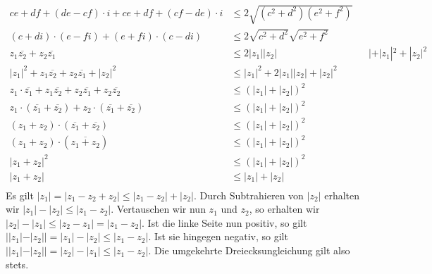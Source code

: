 \documentclass{article}
\begin{document}
\begin{enumerate}[(a)]
\begin{align*}
	ce + df + (de -cf)\cdot i + ce + df + (cf -de)\cdot i &\leq 2\sqrt{(c^2 + d^2)(e^2 + f^2)}\\
	(c + di) \cdot (e -fi) + (e + fi)\cdot (c -di)&\leq 2\sqrt{c^2 + d^2}\sqrt{e^2 + f^2}\\
	z_1\overline{z_2} + z_2\overline{z_1} &\leq 2|z_1||z_2|&&|+|z_1|^2 + |z_2|^2\\
	|z_1|^2 + z_1\overline{z_2} + z_2\overline{z_1} + |z_2|^2 &\leq |z_1|^2 + 2|z_1||z_2| + |z_2|^2\\
	z_1 \cdot \overline{z_1} + z_1\overline{z_2} + z_2\overline{z_1} + z_2\overline{z_2} &\leq (|z_1| + |z_2|)^2\\
	z_1 \cdot (\overline{z_1} + \overline{z_2}) + z_2 \cdot (\overline{z_1} + \overline{z_2}) &\leq (|z_1| + |z_2|)^2\\
	(z_1 + z_2) \cdot (\overline{z_1} + \overline{z_2}) &\leq (|z_1| + |z_2|)^2\\
	(z_1 + z_2) \cdot (\overline{z_1+z_2}) &\leq (|z_1| + |z_2|)^2\\
	|z_1 + z_2|^2 &\leq (|z_1| + |z_2|)^2\\
	|z_1 + z_2| &\leq |z_1| + |z_2|\\
	\end{align*}
	Es gilt $|z_1| = |z_1 - z_2 + z_2| \leq |z_1-z_2| + |z_2|$. Durch Subtrahieren von $|z_2|$ erhalten wir $|z_1|-|z_2| \leq |z_1-z_2|$. Vertauschen wir nun $z_1$ und $z_2$, so erhalten wir $|z_2|-|z_1| \leq |z_2-z_1| = |z_1-z_2|$. Ist die linke Seite nun positiv, so gilt $||z_1|-|z_2|| = |z_1|-|z_2|\leq |z_1-z_2|$. Ist sie hingegen negativ, so gilt $||z_1|-|z_2|| = |z_2|-|z_1| \leq |z_1-z_2|$. Die umgekehrte Dreiecksungleichung gilt also stets.
\end{enumerate}
\end{document}

